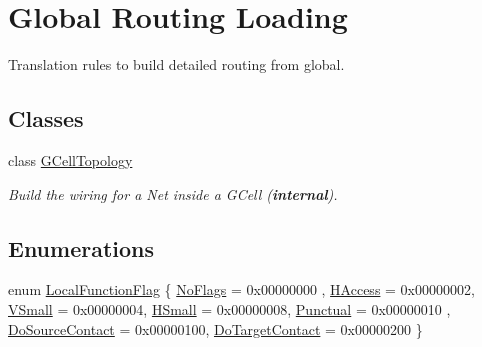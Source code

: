 \hypertarget{group__LoadGlobalRouting}{}\section{Global Routing Loading}
\label{group__LoadGlobalRouting}


Translation rules to build detailed routing from global.  


\subsection*{Classes}
\begin{DoxyCompactItemize}
\item 
class \hyperlink{classanonymous__namespace_02LoadGrByNet_8cpp_03_1_1GCellTopology}{G\+Cell\+Topology}
\begin{DoxyCompactList}\small\item\em Build the wiring for a Net inside a G\+Cell ({\bfseries internal}). \end{DoxyCompactList}\end{DoxyCompactItemize}
\subsection*{Enumerations}
\begin{DoxyCompactItemize}
\item 
enum \hyperlink{group__LoadGlobalRouting_gaec07c7f30c801c3b0f72193757250d64}{Local\+Function\+Flag} \{ \newline
\hyperlink{group__LoadGlobalRouting_ggaec07c7f30c801c3b0f72193757250d64add44bf8d6f7bbe1393d76b940b85294b}{No\+Flags} = 0x00000000
, \newline
\hyperlink{group__LoadGlobalRouting_ggaec07c7f30c801c3b0f72193757250d64a5c3692a6c886c6293a3c9f240b60a5d9}{H\+Access} = 0x00000002, 
\newline
\hyperlink{group__LoadGlobalRouting_ggaec07c7f30c801c3b0f72193757250d64a260f6bf57246879aed7febfe83c9dacc}{V\+Small} = 0x00000004, 
\newline
\hyperlink{group__LoadGlobalRouting_ggaec07c7f30c801c3b0f72193757250d64af1a4f1cb841460f20d26dcf902247fb8}{H\+Small} = 0x00000008, 
\newline
\hyperlink{group__LoadGlobalRouting_ggaec07c7f30c801c3b0f72193757250d64a65b52a199afe857e3d551dbac8b293b9}{Punctual} = 0x00000010
, \newline
\hyperlink{group__LoadGlobalRouting_ggaec07c7f30c801c3b0f72193757250d64aece46caaf822b33d7db94bb2dd16a30d}{Do\+Source\+Contact} = 0x00000100, 
\newline
\hyperlink{group__LoadGlobalRouting_ggaec07c7f30c801c3b0f72193757250d64aeb33c01c5e62df73de6b11888b17a5f2}{Do\+Target\+Contact} = 0x00000200
 \}
\end{DoxyCompactItemize}
